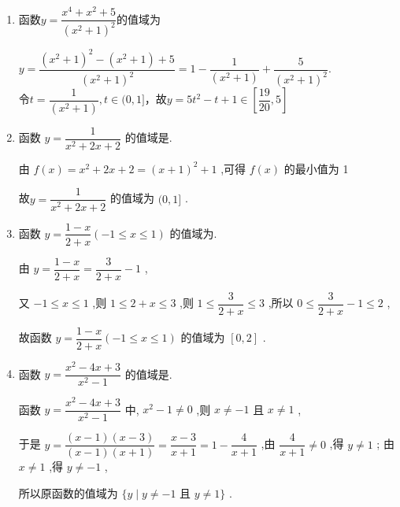 \begin{enumerate}
    \item 函数$y=\dfrac{x^4+x^2+5}{(x^2+1)^2}$的值域为
    \begin{jieda}
        $y=\dfrac{(x^2+1)^2-(x^2+1)+5}{(x^2+1)^2}=1 - \dfrac{1}{(x^2+1)} + \dfrac{5}{(x^2+1)^2}$. \\
        令$t = \dfrac{1}{(x^2+1)}, t \in (0, 1]$，故$y = 5t^2-t+1 \in \left[\dfrac{19}{20}, 5\right]$
    \end{jieda}
    
    \item 函数 $y = \dfrac{1}{{x}^{2} + {2x} + 2}$ 的值域是.
    \begin{jieda}
        由 $f\left( x\right)  = {x}^{2} + {2x} + 2 = {\left( x + 1\right) }^{2} + 1$ ,可得 $f\left( x\right)$ 的最小值为 1
        
        故$y = \dfrac{1}{{x}^{2} + {2x} + 2}$ 的值域为 $(0,1\rbrack$ .
    \end{jieda} 
    
    
    \item 函数 $y = \dfrac{1 - x}{2 + x}\left( {-1 \leq  x \leq  1}\right)$ 的值域为.
    \begin{jieda}
        由 $y = \dfrac{1 - x}{2 + x} = \dfrac{3}{2 + x} - 1$ ,
        
        又 $- 1 \leq  x \leq  1$ ,则 $1 \leq  2 + x \leq  3$ ,则 $1 \leq  \dfrac{3}{2 + x} \leq  3$ ,所以 $0 \leq  \dfrac{3}{2 + x} - 1 \leq  2$ ,
        
        故函数 $y = \dfrac{1 - x}{2 + x}\left( {-1 \leq  x \leq  1}\right)$ 的值域为 $\left\lbrack  {0,2}\right\rbrack$ .
    \end{jieda}
    
    \item 函数 $y = \dfrac{{x}^{2} - {4x} + 3}{{x}^{2} - 1}$ 的值域是.
    \begin{jieda}
        函数 $y = \dfrac{{x}^{2} - {4x} + 3}{{x}^{2} - 1}$ 中, ${x}^{2} - 1 \neq  0$ ,则 $x \neq   - 1$ 且 $x \neq  1$ ,
        
        于是 $y = \dfrac{\left( {x - 1}\right) \left( {x - 3}\right) }{\left( {x - 1}\right) \left( {x + 1}\right) } = \dfrac{x - 3}{x + 1} = 1 - \dfrac{4}{x + 1}$ ,由 $\dfrac{4}{x + 1} \neq  0$ ,得 $y \neq  1$ ; 由 $x \neq  1$ ,得 $y \neq   - 1$ ,
        
        所以原函数的值域为 $\{ y \mid  y \neq   - 1$ 且 $y \neq  1\}$ .
    \end{jieda}
\end{enumerate}

